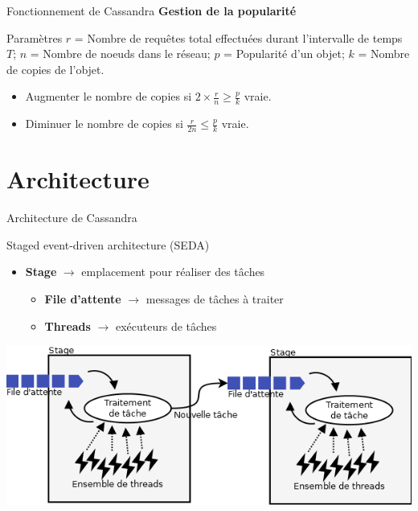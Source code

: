 \documentclass{beamer}
\newcommand{\fail}{\color{FailedRed}\XSolidBold}
\begin{document}
\begin{frame}{Fonctionnement de Cassandra}
\textbf{Gestion de la popularité} \fail
\begin{block}{Paramètres}
    $r$ = Nombre de requêtes total effectuées durant l'intervalle de temps $T$; \newline
    $n$ = Nombre de noeuds dans le réseau; \newline
    $p$ = Popularité d'un objet; \newline
    $k$ = Nombre de copies de l'objet.
\end{block}

\begin{itemize}
    \item Augmenter le nombre de copies si $ 2 \times \frac{r}{n} \geq \frac{p}{k} $ vraie.
    \item Diminuer le nombre de copies si $ \frac{r}{2n} \leq \frac{p}{k} $ vraie.
\end{itemize}
\end{frame}


\section{Architecture}


\begin{frame}{Architecture de Cassandra}
\begin{block}{Staged event-driven architecture (SEDA)}
\begin{itemize}
    \item \textbf{Stage} $\rightarrow$ emplacement pour réaliser des tâches
    \begin{itemize}
	    \item \textbf{File d'attente} $\rightarrow$ messages de tâches à traiter
	    \item \textbf{Threads} $\rightarrow$ exécuteurs de tâches
    \end{itemize}
\end{itemize}
\end{block}
\centering
	\includegraphics[scale=0.42]{stages}
\end{frame}
\end{document}
